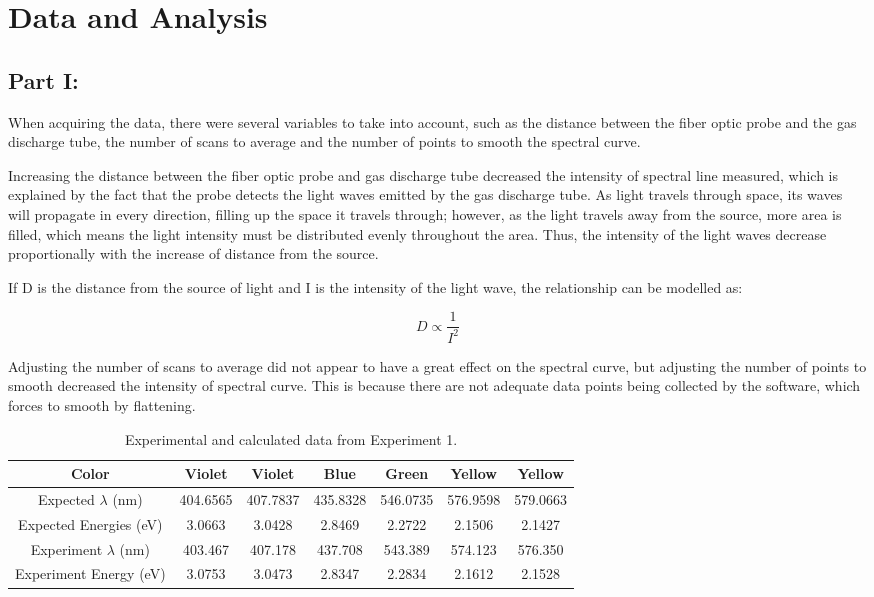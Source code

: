 \documentclass[10pt, letterpaper, twoside]{article}
\begin{document}
\section{Data and Analysis}

\subsection{Part I:}
\vspace{-1em}

When acquiring the data, there were several variables to take into account, such as the distance between the fiber optic probe and the gas discharge tube, the number of scans to average and the number of points to smooth the spectral curve. 

Increasing the distance between the fiber optic probe and gas discharge tube decreased the intensity of spectral line measured, which is explained by the fact that the probe detects the light waves emitted by the gas discharge tube. As light travels through space, its waves will propagate in every direction, filling up the space it travels through; however, as the light travels away from the source, more area is filled, which means the light intensity must be distributed evenly throughout the area. Thus, the intensity of the light waves decrease proportionally with the increase of distance from the source.

If D is the distance from the source of light and I is the intensity of the light wave, the relationship can be modelled as: \vspace{-2em}

\begin{equation*}
   D \propto \frac{1}{I^2}  
\end{equation*}

Adjusting the number of scans to average did not appear to have a great effect on the spectral curve, but adjusting the number of points to smooth decreased the intensity of spectral curve. This is because there are not adequate data points being collected by the software, which forces to smooth by flattening. 

\begin{table}[!ht]
    \centering
    \begin{tabular}{|c|c|c|c|c|c|c|}
        \hline
        Color & Violet & Violet & Blue & Green & Yellow & Yellow \\
        \hline
        Expected $\lambda$ (nm) & 404.6565 & 407.7837 & 435.8328 & 546.0735 & 576.9598 & 579.0663 \\
        \hline
        Expected Energies (eV) & 3.0663 & 3.0428 & 2.8469 & 2.2722 & 2.1506 & 2.1427 \\
        \hline
        Experiment $\lambda$ (nm) & 403.467 & 407.178 & 437.708 & 543.389 & 574.123 & 576.350 \\
        \hline
        Experiment Energy (eV) & 3.0753 & 3.0473 & 2.8347 & 2.2834 & 2.1612 & 2.1528\\
        \hline
    \end{tabular}
    \caption{Experimental and calculated data from Experiment 1.}
    \label{tab:my_label}
\end{table}
\end{document}
